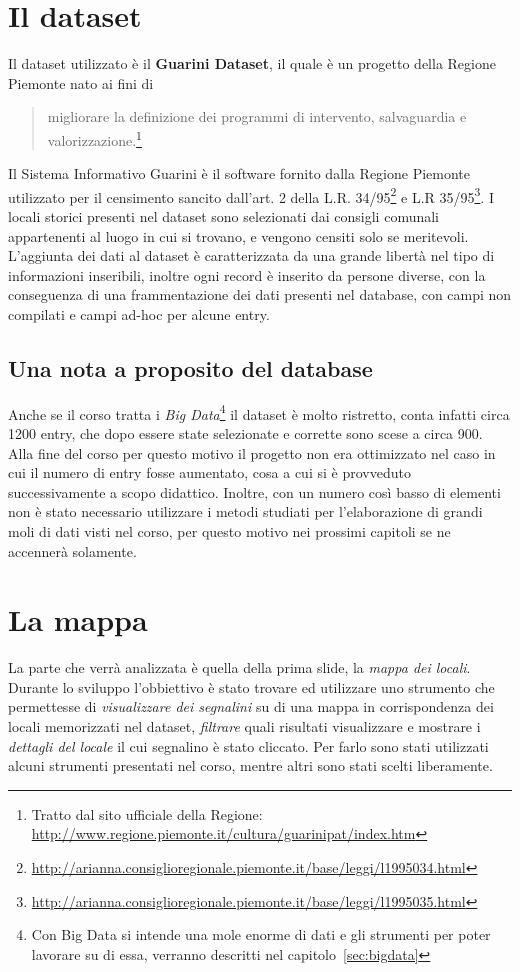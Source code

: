 \section{Il dataset}
Il dataset utilizzato è il \textbf{Guarini Dataset}, il quale è un progetto della Regione Piemonte nato ai fini di \begin{quote}%
migliorare la definizione dei programmi di intervento, salvaguardia e valorizzazione.\footnote{Tratto dal sito ufficiale della Regione: \url{http://www.regione.piemonte.it/cultura/guarinipat/index.htm}}
\end{quote}%
Il Sistema Informativo Guarini è il software fornito dalla Regione Piemonte utilizzato per il censimento sancito dall'art. 2 della L.R. 34/95\footnote{\url{http://arianna.consiglioregionale.piemonte.it/base/leggi/l1995034.html}} e L.R 35/95\footnote{\url{http://arianna.consiglioregionale.piemonte.it/base/leggi/l1995035.html}}. I locali storici presenti nel dataset sono selezionati dai consigli comunali appartenenti al luogo in cui si trovano, e vengono censiti solo se meritevoli. L'aggiunta dei dati al dataset è caratterizzata da una grande libertà nel tipo di informazioni inseribili, inoltre ogni record è inserito da persone diverse, con la conseguenza di una frammentazione dei dati presenti nel database, con campi non compilati e campi ad-hoc per alcune entry.
\subsection{Una nota a proposito del database}
Anche se il corso tratta i \emph{Big Data}\footnote{Con Big Data si intende una mole enorme di dati e gli strumenti per poter lavorare su di essa, verranno descritti nel capitolo~\ref{sec:bigdata}} il dataset è molto ristretto, conta infatti circa 1200 entry, che dopo essere state selezionate e corrette sono scese a circa 900. Alla fine del corso per questo motivo il progetto non era ottimizzato nel caso in cui il numero di entry fosse aumentato, cosa a cui si è provveduto successivamente a scopo didattico. Inoltre, con un numero così basso di elementi non è stato necessario utilizzare i metodi studiati per l'elaborazione di grandi moli di dati visti nel corso, per questo motivo nei prossimi capitoli se ne accennerà solamente.


\section{La mappa}
La parte che verrà analizzata è quella della prima slide, la \emph{mappa dei locali}. Durante lo sviluppo l'obbiettivo è stato trovare ed utilizzare uno strumento che permettesse di \emph{visualizzare dei segnalini} su di una mappa in corrispondenza dei locali memorizzati nel dataset, \emph{filtrare} quali risultati visualizzare e mostrare i \emph{dettagli del locale} il cui segnalino è stato cliccato.
Per farlo sono stati utilizzati alcuni strumenti presentati nel corso, mentre altri sono stati scelti liberamente.
